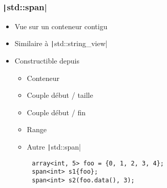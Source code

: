 \documentclass[C++.tex]{subfiles}
\begin{document}
\begin{frame}[fragile]
	\frametitle{\texttt|std::span|}
	\begin{itemize}
		\item Vue sur un conteneur contigu
		\item Similaire à \texttt|std::string_view|
		\item Constructible depuis
		\begin{itemize}
			\item Conteneur
			\item Couple début / taille
			\item Couple début / fin
			\item Range
			\item Autre \texttt|std::span|
		\end{itemize}
	\end{itemize}

	\begin{verbatim}
		array<int, 5> foo = {0, 1, 2, 3, 4};
		span<int> s1{foo};
		span<int> s2(foo.data(), 3);
	\end{verbatim}

\end{frame}
\end{document}
